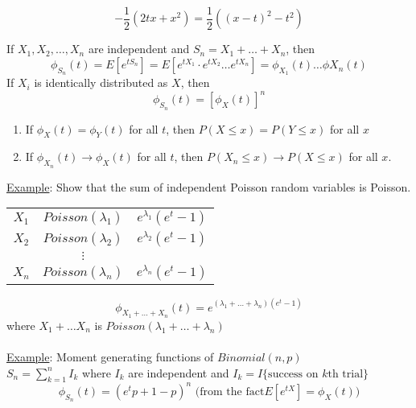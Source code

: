       $$
        -\frac{1}{2}(2tx + x^2) = \frac{1}{2}((x-t)^2 - t^2)
      $$
      \begin{lemma}
        If $X_1, X_2, \ldots, X_n$ are independent and $S_n = X_1 + \ldots + 
        X_n$, then 
        $$
          \phi_{S_n}(t) = E[e^{tS_n}] = E[e^{tX_1} \cdot e^{tX_2} \ldots 
          e^{tX_n}] = \phi_{X_1}(t) \ldots \phi{X_n}(t)
        $$
        If $X_i$ is identically distributed as $X$, then
        $$
          \phi_{S_n}(t) = [\phi_X(t)]^n
        $$
      \end{lemma}
      \begin{theorem}
        \begin{enumerate}
          \item If $\phi_X(t) = \phi_Y(t)$ for all $t$, then
            $P(X \le x) = P(Y \le x)$ for all $x$
          \item If $\phi_{X_n}(t) \to \phi_X(t)$ for all $t$,
            then $P(X_n \le x) \to P(X \le x)$ for all $x$.
        \end{enumerate}
      \end{theorem}
      
      \underline{Example}:
        Show that the sum of independent Poisson random variables
        is Poisson.\\
        \begin{tabular}{c c c}
        $X_1$ & $Poisson(\lambda_1)$ & $e^{\lambda_1}(e^t - 1)$\\
        $X_2$ & $Poisson(\lambda_2)$ & $e^{\lambda_2}(e^t - 1)$\\
        & $\vdots$ &\\
        $X_n$ & $Poisson(\lambda_n)$ & $e^{\lambda_n}(e^t - 1)$\\
        \end{tabular}

      $$
        \phi_{X_1 + \ldots + X_n}(t) = e^{(\lambda_1 + \ldots + \lambda_n)(e^t - 1)}
      $$
      where $X_1 + \ldots X_n$ is $Poisson(\lambda_1 + \ldots + \lambda_n)$\\\\
      \underline{Example}: Moment generating functions of $Binomial(n,p)$\\
        $S_n = \sum_{k = 1}^n I_k$ where $I_k$ are independent and $I_k = 
        I\{\text{success on $k$th trial}\}$\\
        $$
          \phi_{S_n}(t) = (e^tp + 1 - p)^n \text{  (from the fact} E[e^{tX}] = \phi_X(t) \text{)}
        $$
